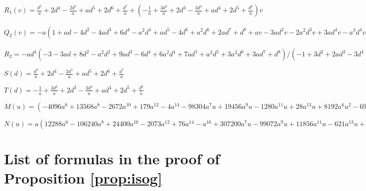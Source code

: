 \documentclass{gtpart}
\theoremstyle{definition}
\theoremstyle{remark}
\begin{document}
$R_1(v) = \frac{d^3}{a} + 2 d^4 - \frac{2 d^5}{a} + a d^5 + 
 2 d^6 + \frac{d^7}{a} + (-\frac{1}{a} + \frac{3 d^2}{a} + 2 d^3 - \frac{3 d^4}{a} + a d^4 + 
    2 d^5 + \frac{d^6}{a}) v$

$Q_2(v) = -a (1 + a d - 4 d^2 - 4 a d^3 + 6 d^4 - a^2 d^4 + a d^5 - 4 d^6 + 
    a^2 d^6 + 2 a d^7 + d^8 + a v - 3 a d^2 v - 2 a^2 d^3 v + 
    3 a d^4 v - a^3 d^4 v - 2 a^2 d^5 v - a d^6 v) / (-1 + 3 d^2 + 
   2 a d^3 - 3 d^4 + a^2 d^4 + 2 a d^5 + d^6)^2$

$R_2 = -a d^4 (-3 - 3 a d + 8 d^2 - a^2 d^2 + 9 a d^3 - 6 d^4 + 
    6 a^2 d^4 + 7 a d^5 + a^3 d^5 + 3 a^2 d^6 + 3 a d^7 + d^8) / (-1 + 
   3 d^2 + 2 a d^3 - 3 d^4 + a^2 d^4 + 2 a d^5 + d^6)^2$

$S(d) = \frac{d^3}{a} + 2 d^4 - \frac{2 d^5}{a} + a d^5 + 
 2 d^6 + \frac{d^7}{a}$

$T(d) = -\frac{1}{a} + \frac{3 d^2}{a} + 2 d^3 - \frac{3 d^4}{a} + a d^4 + 
    2 d^5 + \frac{d^6}{a}$

$M(u) = (-4096 a^6 + 13568 a^8 - 2672 a^{10} + 179 a^{12} - 
  4 a^{14} - 98304 a^7 u + 19456 a^9 u - 1280 a^{11} u + 28 a^{13} u + 
  8192 a^6 u^2 - 69120 a^8 u^2 + 17248 a^{10} u^2 - 1610 a^{12} u^2 + 
  66 a^{14} u^2 - a^{16} u^2 + 77824 a^7 u^3 - 41984 a^9 u^3 + 
  6384 a^{11} u^3 - 382 a^{13} u^3 + 8 a^{15} u^3 - 4096 a^6 u^4 - 
  55040 a^8 u^4 + 11792 a^{10} u^4 - 825 a^{12} u^4 + 19 a^{14} u^4 - 
  28672 a^7 u^5 + 6144 a^9 u^5 - 432 a^{11} u^5 + 10 a^{13} u^5) / (65536 a^8 - 16384 a^{10} + 1536 a^{12} - 
 64 a^{14} + a^{16})$

$N(u) = a (12288 a^6 - 106240 a^8 + 24400 a^{10} - 2073 a^{12} + 
   76 a^{14} - a^{16} + 307200 a^7 u - 99072 a^9 u + 11856 a^{11} u - 
   621 a^{13} u + 12 a^{15} u - 20480 a^6 u^2 + 296192 a^8 u^2 - 
   71856 a^{10} u^2 + 6555 a^{12} u^2 - 265 a^{14} u^2 + 4 a^{16} u^2 - 
   135168 a^7 u^3 + 199680 a^9 u^3 - 40272 a^{11} u^3 + 3082 a^{13} u^3 - 
   98 a^{15} u^3 + a^{17} u^3 + 4096 a^6 u^4 + 213760 a^8 u^4 - 
   22928 a^{10} u^4 - 1435 a^{12} u^4 + 239 a^{14} u^4 - 7 a^{16} u^4 + 
   12288 a^7 u^5 + 78592 a^9 u^5 - 16880 a^{11} u^5 + 1177 a^{13} u^5 - 
   27 a^{15} u^5 + 4096 a^6 u^6 + 83712 a^8 u^6 - 17936 a^{10} u^6 + 
   1257 a^{12} u^6 - 29 a^{14} u^6 + 28672 a^7 u^7 - 6144 a^9 u^7 + 
   432 a^{11} u^7 - 10 a^{13} u^7) / (65536 a^8 - 16384 a^{10} + 1536 a^{12} - 
 64 a^{14} + a^{16})$


\section{List of formulas in the proof of Proposition \ref{prop:isog}}
\label{apx:isog}
\end{document}
